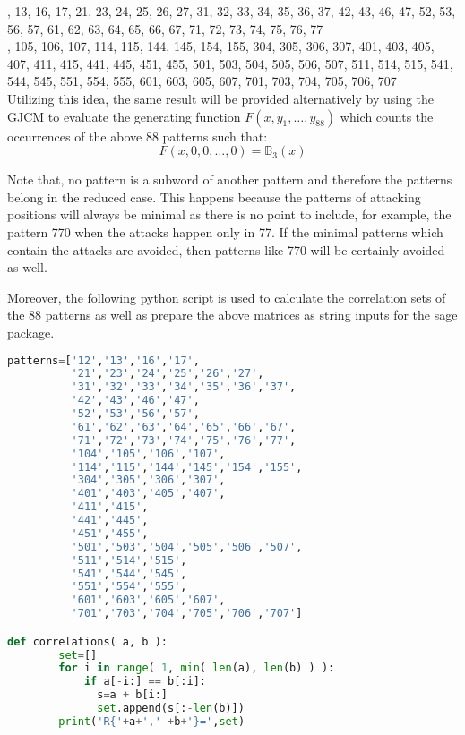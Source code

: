 \documentclass[12pt]{report}
\begin{document}
{{, 13, 16, 17, 21, 23, 24, 25, 26, 27, 31, 32, 33, 34, 35, 36, 37, 42, 43, 46, 47, 52, 53, 56, 57, 61, 62, 63, 64, 65, 66, 67, 71, 72, 73, 74, 75, 76, 77 \\
          
, 105, 106, 107, 114, 115, 144, 145, 154, 155, 304, 305, 306, 307, 401, 403, 405, 407, 411, 415, 441, 445, 451, 455, 501, 503, 504, 505, 506, 507, 511, 514, 515, 541, 544, 545, 551, 554, 555, 601, 603, 605, 607, 701, 703, 704, 705, 706, 707 \\


\noindent Utilizing this idea, the same result will be provided alternatively by using the GJCM to evaluate the generating function $F(x,y_1,\ldots,y_{88})$ which counts the occurrences of the above 88 patterns such that:
\[F(x,0,0,\ldots,0)=\mathbb{B}_3(x)\]

\noindent Note that, no pattern is a subword of another pattern and therefore the patterns belong in the reduced case. This happens because the patterns of attacking positions will always be minimal as there is no point to include, for example, the pattern 770 when the attacks happen only in 77. If the minimal patterns which contain the attacks are avoided, then patterns like 770 will be certainly avoided as well. 

\noindent Moreover, the following python script is used to calculate the correlation sets of the 88 patterns as well as prepare the above matrices as string inputs for the sage package. \\


{
\begin{lstlisting}[language=Python]
patterns=['12','13','16','17',
          '21','23','24','25','26','27',
          '31','32','33','34','35','36','37',
          '42','43','46','47',
          '52','53','56','57',
          '61','62','63','64','65','66','67',
          '71','72','73','74','75','76','77',
          '104','105','106','107',
          '114','115','144','145','154','155',
          '304','305','306','307',
          '401','403','405','407',
          '411','415',
          '441','445',
          '451','455',
          '501','503','504','505','506','507',
          '511','514','515',
          '541','544','545',
          '551','554','555',
          '601','603','605','607',
          '701','703','704','705','706','707']

def correlations( a, b ):
        set=[]
        for i in range( 1, min( len(a), len(b) ) ):
            if a[-i:] == b[:i]:
              s=a + b[i:]
              set.append(s[:-len(b)])
        print('R{'+a+',' +b+'}=',set)


\end{lstlisting}}}}
\end{document}
